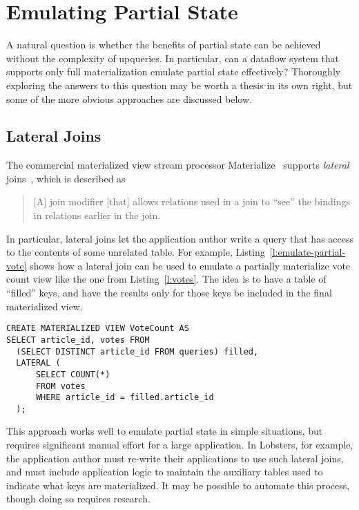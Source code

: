 \section{Emulating Partial State}
\label{s:disc:emulating}

A natural question is whether the benefits of partial state can be achieved
without the complexity of upqueries. In particular, can a dataflow system that
supports only full materialization emulate partial state effectively? Thoroughly
exploring the answers to this question may be worth a thesis in its own right,
but some of the more obvious approaches are discussed below.

\subsection{Lateral Joins}

The commercial materialized view stream processor Materialize~\cite{materialize}
supports \emph{lateral} joins~\cite{lateral-join}, which is described as

\begin{quote}
  [A] join modifier [that] allows relations used in a join to ``see'' the
  bindings in relations earlier in the join.
\end{quote}

In particular, lateral joins let the application author write a query that has
access to the contents of some unrelated table. For example,
Listing~\vref{l:emulate-partial-vote} shows how a lateral join can be used to
emulate a partially materialize vote count view like the one from
Listing~\vref{l:votes}. The idea is to have a table of ``filled'' keys, and have
the results only for those keys be included in the final materialized view.

\begin{listing}[h]
  \begin{verbatim}
CREATE MATERIALIZED VIEW VoteCount AS
SELECT article_id, votes FROM
  (SELECT DISTINCT article_id FROM queries) filled,
  LATERAL (
      SELECT COUNT(*)
      FROM votes
      WHERE article_id = filled.article_id
  );
  \end{verbatim}
  \caption{Using a Materialize lateral join to emulate partial state in vote.}
  \label{l:emulate-partial-vote}
\end{listing}

This approach works well to emulate partial state in simple situations, but
requires significant manual effort for a large application. In Lobsters, for
example, the application author must re-write their applications to use such
lateral joins, and must include application logic to maintain the auxiliary
tables used to indicate what keys are materialized. It may be possible to
automate this process, though doing so requires research.

